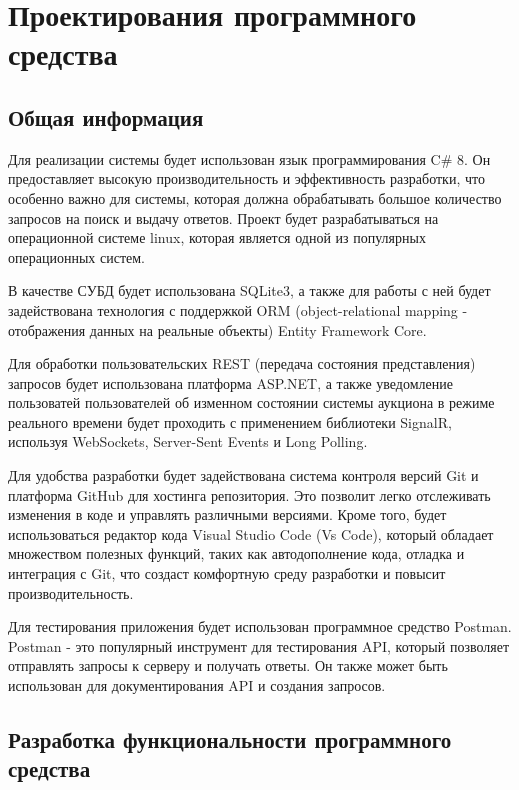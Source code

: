 \section{Проектирования программного средства}


\subsection{Общая информация}

Для реализации системы будет использован язык программирования
C\# 8. Он предоставляет высокую производительность и
эффективность разработки, что особенно важно для системы, которая должна
обрабатывать большое количество запросов на поиск и выдачу ответов. Проект
будет разрабатываться на операционной системе linux, которая является
одной из популярных операционных систем.

В качестве СУБД будет использована SQLite3, а также для работы с ней 
будет задействована технология с поддержкой ORM (object-relational mapping - отображения данных на реальные объекты)
Entity Framework Core.

Для обработки пользовательских REST (передача состояния представления) запросов будет использована платформа ASP.NET,
а также уведомление пользоватей пользователей об изменном состоянии системы аукциона в режиме реального времени
будет проходить с применением библиотеки SignalR, используя WebSockets, Server-Sent Events и Long Polling. 

Для удобства разработки будет задействована система контроля версий Git 
и платформа GitHub для хостинга репозитория. 
Это позволит легко отслеживать изменения в коде и управлять различными версиями. 
Кроме того, будет использоваться редактор кода Visual Studio Code (Vs Code), 
который обладает множеством полезных функций, 
таких как автодополнение кода, отладка и интеграция с Git, 
что создаст комфортную среду разработки и повысит производительность.

Для тестирования приложения будет использован программное средство Postman. 
Postman - это популярный инструмент для тестирования API, который позволяет отправлять запросы к серверу и получать ответы. 
Он также может быть использован для документирования API и создания запросов.

\subsection{Разработка функциональности программного средства}

